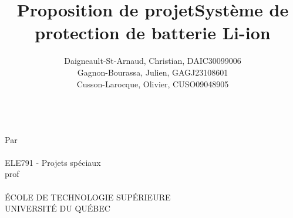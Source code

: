 

\title{Proposition de projet}
\title{Système de protection de batterie Li-ion}
\author{
	Daigneault-St-Arnaud, Christian, DAIC30099006 \\
	Gagnon-Bourassa, Julien, GAGJ23108601 \\
	Cusson-Larocque, Olivier, CUSO09048905
}
\newcommand{\cours}{ELE791 - Projets sp\'{e}ciaux }
\newcommand{\prof}{prof}



\makeatletter
\begin{titlepage}
	\begin{center}
	{\Huge \@title}\\ 
	\vspace{3cm}
	{\large Par \\
		\vspace{0.5cm}
		\@author \\
		\vspace{3cm}
		\cours \\
		\vspace{0.5cm}
		\prof \\
		\vspace{3.5cm}
		\@date \\
		\vspace{3.5cm}
		\'{E}COLE DE TECHNOLOGIE SUP\'{E}RIEURE \\
		UNIVERSIT\'{E} DU QUÉBEC
	}		
	\end{center}
\end{titlepage}
\makeatother




